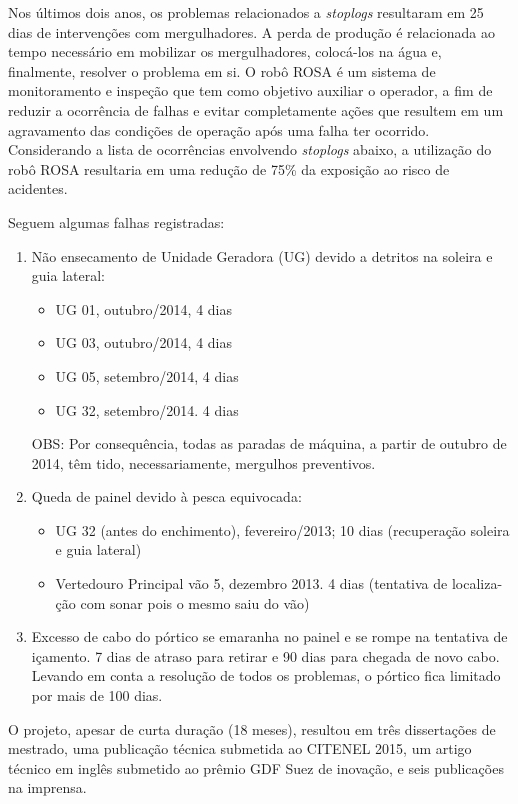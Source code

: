 Nos últimos dois anos, os problemas relacionados a \textit{stoplogs}
resultaram em 25 dias de intervenções com mergulhadores. A perda de
produção é relacionada ao tempo necessário em mobilizar os mergulhadores,
colocá-los na água e, finalmente, resolver o problema em si. O robô ROSA é um
sistema de monitoramento e inspeção que tem como objetivo auxiliar o
operador, a fim de reduzir a ocorrência de falhas e evitar completamente ações
que resultem em um agravamento das condições de operação após uma falha ter
ocorrido. Considerando a lista de ocorrências envolvendo \textit{stoplogs}
abaixo, a utilização do robô ROSA resultaria em uma redução de 75\% da
exposição ao risco de acidentes.

Seguem algumas falhas registradas:
\begin{enumerate}
\item Não ensecamento de Unidade Geradora (UG) devido a detritos na soleira e
guia lateral:
\begin{itemize}
\item UG 01, outubro/2014, 4 dias
\item UG 03, outubro/2014, 4 dias
\item UG 05, setembro/2014, 4 dias
\item UG 32, setembro/2014. 4 dias	
\end{itemize}
OBS: Por consequência, todas as paradas de máquina, a partir de
outubro de 2014, têm tido, necessariamente, mergulhos
preventivos. 
\item Queda de painel devido à pesca equivocada:
\begin{itemize}
\item UG 32 (antes do enchimento), fevereiro/2013; 10 dias (recuperação
soleira e guia lateral)
\item Vertedouro Principal vão 5, dezembro 2013. 4 dias (tentativa de
localiza-\-ção com sonar pois o mesmo saiu do vão)
\end{itemize}
\item Excesso de cabo do pórtico se emaranha no painel e se rompe na
tentativa de içamento. 7 dias de atraso para retirar e 90 dias para chegada de
novo cabo. Levando em conta a resolução de todos os problemas, o pórtico fica limitado por mais de 100 dias.
\end{enumerate}

O projeto, apesar de curta duração (18 meses), resultou em três dissertações de 
mestrado, uma publicação técnica submetida ao CITENEL 2015, um artigo técnico 
em inglês submetido ao prêmio GDF Suez de inovação, e seis publicações na
imprensa.

